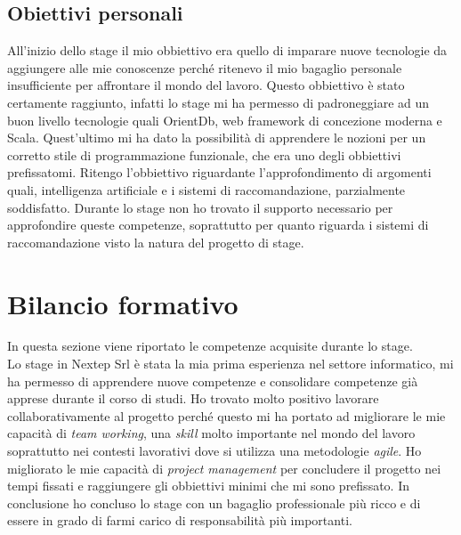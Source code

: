 \subsection{Obiettivi personali}
All'inizio dello stage il mio obbiettivo era quello di imparare nuove tecnologie da aggiungere alle mie conoscenze perché ritenevo il mio bagaglio personale insufficiente per affrontare il mondo del lavoro. Questo obbiettivo è stato certamente raggiunto, infatti lo stage mi ha permesso di padroneggiare ad un buon livello tecnologie quali OrientDb, web framework di concezione moderna e Scala. Quest'ultimo mi ha dato la possibilità di apprendere le nozioni per un corretto stile di programmazione funzionale, che era uno degli obbiettivi prefissatomi. Ritengo l'obbiettivo riguardante l'approfondimento di argomenti quali, intelligenza artificiale e i sistemi di raccomandazione, parzialmente soddisfatto. Durante lo stage non ho trovato il supporto necessario per approfondire queste competenze, soprattutto per quanto riguarda i sistemi di raccomandazione visto la natura del progetto di stage.




\section{Bilancio formativo}
In questa sezione viene riportato le competenze acquisite durante lo stage.\\
Lo stage in Nextep Srl è stata la  mia prima esperienza nel settore informatico, mi ha permesso di apprendere nuove competenze e consolidare competenze già apprese durante il corso di studi.
Ho trovato molto positivo lavorare collaborativamente al progetto perché questo mi ha portato ad migliorare le mie capacità di \emph{team working}, una \emph{skill} molto importante nel mondo del lavoro soprattutto nei contesti lavorativi dove si utilizza una metodologie \emph{agile}. Ho migliorato le mie capacità di \emph{project management} per concludere il progetto nei tempi fissati e raggiungere gli obbiettivi minimi che mi sono prefissato. In conclusione ho concluso lo stage con un bagaglio professionale più ricco e di essere in grado di farmi carico di responsabilità più importanti.
